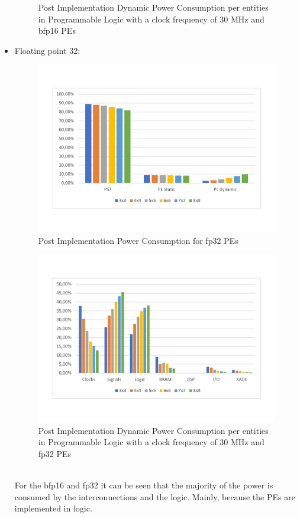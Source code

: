 \begin{itemize}
\begin{figure}[!htbp]
\caption{Post Implementation Dynamic Power Consumption per entities in Programmable Logic with a clock frequency of 30 MHz and bfp16 PEs}
\label{fig:dynpowintbfp16ent30}
\end{figure}
\newpage
\item Floating point 32: 
\begin{figure}[!htbp]
\centering
\captionsetup{justification=centering}
\includegraphics[scale=0.47,angle=0]{./figure/graphs/power_fp32_freq.pdf}
\caption{Post Implementation Power Consumption for fp32 PEs}
\label{fig:powfp32}
\end{figure}
\begin{figure}[!htbp]
\centering
\captionsetup{justification=centering}
\includegraphics[scale=0.47,angle=0]{./figure/graphs/power_pldyn_div_fp32_freq_30mhz.pdf}
\caption{Post Implementation Dynamic Power Consumption per entities in Programmable Logic with a clock frequency of 30 MHz and fp32 PEs}
\label{fig:dynpowintfp32ent30}
\end{figure}\\
For the bfp16 and fp32 it can be seen that the majority of the power is consumed by the interconnections and the logic. Mainly, because the PEs are implemented in logic.
\end{itemize}
